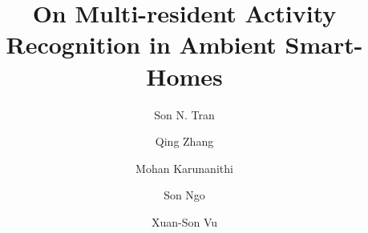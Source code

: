 \newcommand{\fzif}[0]{%
  \raisebox{0.08cm}{
      \begin{tikzpicture}
           \draw[<<->](0,0) -- (0.5,0); %
      \end{tikzpicture}
   }
}
\newcommand{\diff}[0]{%
  \raisebox{0.08cm}{
      \begin{tikzpicture}
           \draw[<->,dashed](0,0) -- (0.5,0); %
      \end{tikzpicture}
   }
}
\newcommand{\pr}[1]{
  \mathsf{#1}
}
\newcommand{\subsubsubsection}[1]{
\noindent 
\\
\textbf{#1}
\\
}
\renewcommand{\eqref}[1]{
  Eq. \ref{#1}%
}
\newcommand{\alref}[1]{
  Algorithm \ref{#1}
}
\newcommand{\fgref}[1]{
  Figure \ref{#1}%
}
\newcommand{\tbref}[1]{
  Table \ref{#1}%
}

\newcommand{\sref}[1]{
   \S \ref{#1}%
}
\newcommand{\chapref}[1]{
  \textbf{Chapter \ref{#1}}%
}
\newcommand{\pmd}[0]{
  {\it partial-model}%
}
\newcommand{\pmds}[0]{
  {\it partial-models}%
}
\newcommand{\cmd}[0]{
  {\it{complete-model}}%
}
\newcommand{\cmds}[0]{
  {\it complete-models}%
}
\newcommand{\cl}[0]{
  {\it Confidence rules}%
}
\newcommand{\fzit}[1]{
  {\it #1}%
}

\newcommand{\En}[0]{ %
  \fn{E}
 }

%
%
%
%
%


\title{On Multi-resident Activity Recognition in Ambient Smart-Homes}
\subtitle{}


\author{Son N. Tran         \and
  Qing Zhang \and
  Mohan Karunanithi \and
  Son Ngo \and
  Xuan-Son Vu
}



